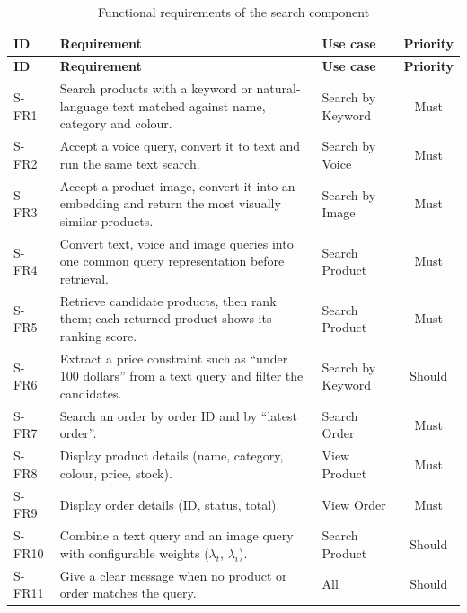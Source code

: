 {\small
\begin{xltabular}{\textwidth}{@{}l Y L{2.6cm} c@{}}
\caption{Functional requirements of the search component}\label{tab:searchfr}\\
\toprule
\textbf{ID} & \textbf{Requirement} & \textbf{Use case} & \textbf{Priority} \\ \midrule
\endfirsthead
\toprule
\textbf{ID} & \textbf{Requirement} & \textbf{Use case} & \textbf{Priority} \\ \midrule
\endhead
\bottomrule
\endlastfoot
S-FR1 & Search products with a keyword or natural-language text matched against name, category and colour. & Search by Keyword & Must \\
S-FR2 & Accept a voice query, convert it to text and run the same text search. & Search by Voice & Must \\
S-FR3 & Accept a product image, convert it into an embedding and return the most visually similar products. & Search by Image & Must \\
S-FR4 & Convert text, voice and image queries into one common query representation before retrieval. & Search Product & Must \\
S-FR5 & Retrieve candidate products, then rank them; each returned product shows its ranking score. & Search Product & Must \\
S-FR6 & Extract a price constraint such as ``under 100 dollars'' from a text query and filter the candidates. & Search by Keyword & Should \\
S-FR7 & Search an order by order ID and by ``latest order''. & Search Order & Must \\
S-FR8 & Display product details (name, category, colour, price, stock). & View Product & Must \\
S-FR9 & Display order details (ID, status, total). & View Order & Must \\
S-FR10 & Combine a text query and an image query with configurable weights ($\lambda_t$, $\lambda_i$). & Search Product & Should \\
S-FR11 & Give a clear message when no product or order matches the query. & All & Should \\
\end{xltabular}
}

